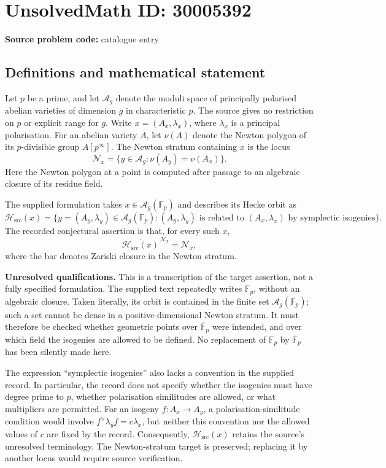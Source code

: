 \documentclass[11pt]{article}
\newcommand{\F}{\mathbb{F}}
\begin{document}
\section*{UnsolvedMath ID: 30005392}
\textbf{Source problem code:} catalogue entry
\subsection{Definitions and mathematical statement}
Let \(p\) be a prime, and let \(\mathcal A_g\) denote the moduli space of principally polarised abelian varieties of dimension \(g\) in characteristic \(p\). The source gives no restriction on \(p\) or explicit range for \(g\). Write \(x=(A_x,\lambda_x)\), where \(\lambda_x\) is a principal polarisation. For an abelian variety \(A\), let \(\nu(A)\) denote the Newton polygon of its \(p\)-divisible group \(A[p^\infty]\). The Newton stratum containing \(x\) is the locus
\[
\mathcal N_x=\{y\in\mathcal A_g:\nu(A_y)=\nu(A_x)\}.
\]
Here the Newton polygon at a point is computed after passage to an algebraic closure of its residue field.

The supplied formulation takes \(x\in\mathcal A_g(\F_p)\) and describes its Hecke orbit as
\[
\mathcal H_{\mathrm{src}}(x)=\bigl\{y=(A_y,\lambda_y)\in\mathcal A_g(\F_p):
(A_y,\lambda_y)\text{ is related to }(A_x,\lambda_x)
\text{ by symplectic isogenies}\bigr\}.
\]
The recorded conjectural assertion is that, for every such \(x\),
\[
\overline{\mathcal H_{\mathrm{src}}(x)}^{\,\mathcal N_x}=\mathcal N_x,
\]
where the bar denotes Zariski closure in the Newton stratum.

\textbf{Unresolved qualifications.} This is a transcription of the target assertion, not a fully specified formulation. The supplied text repeatedly writes \(\F_p\), without an algebraic closure. Taken literally, its orbit is contained in the finite set \(\mathcal A_g(\F_p)\); such a set cannot be dense in a positive-dimensional Newton stratum. It must therefore be checked whether geometric points over \(\overline{\F}_p\) were intended, and over which field the isogenies are allowed to be defined. No replacement of \(\F_p\) by \(\overline{\F}_p\) has been silently made here.

The expression ``symplectic isogenies'' also lacks a convention in the supplied record. In particular, the record does not specify whether the isogenies must have degree prime to \(p\), whether polarisation similitudes are allowed, or what multipliers are permitted. For an isogeny \(f:A_x\to A_y\), a polarisation-similitude condition would involve \(f^\vee\lambda_y f=c\lambda_x\), but neither this convention nor the allowed values of \(c\) are fixed by the record. Consequently, \(\mathcal H_{\mathrm{src}}(x)\) retains the source's unresolved terminology. The Newton-stratum target is preserved; replacing it by another locus would require source verification.
\end{document}
